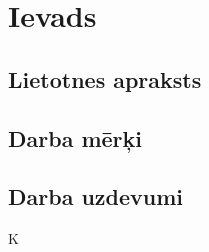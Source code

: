 \section{Ievads}

    \subsection{Lietotnes apraksts}

    \subsection{Darba mērķi}

    \subsection{Darba uzdevumi}

    K
